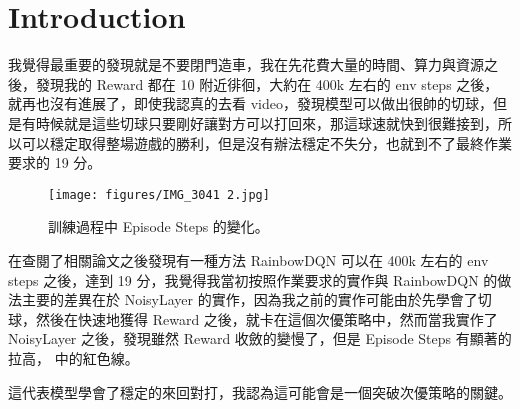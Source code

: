 \section{Introduction}
我覺得最重要的發現就是不要閉門造車，我在先花費大量的時間、算力與資源之後，發現我的 Reward 都在 10 附近徘徊，大約在 400k 左右的 env steps 之後，就再也沒有進展了，即使我認真的去看 video，發現模型可以做出很帥的切球，但是有時候就是這些切球只要剛好讓對方可以打回來，那這球速就快到很難接到，所以可以穩定取得整場遊戲的勝利，但是沒有辦法穩定不失分，也就到不了最終作業要求的 19 分。

\begin{figure}[htbp]
    \centering
    \texttt{[image: figures/IMG\_3041 2.jpg]}
    \caption{訓練過程中 Episode Steps 的變化。}
    \label{fig:episode_steps}
\end{figure}


在查閱了相關論文之後發現有一種方法 RainbowDQN 可以在 400k 左右的 env steps 之後，達到 19 分，我覺得我當初按照作業要求的實作與 RainbowDQN 的做法主要的差異在於 NoisyLayer 的實作，因為我之前的實作可能由於先學會了切球，然後在快速地獲得 Reward 之後，就卡在這個次優策略中，然而當我實作了 NoisyLayer 之後，發現雖然 Reward 收斂的變慢了，但是 Episode Steps 有顯著的拉高，\label{fig:episode_steps} 中的紅色線。


這代表模型學會了穩定的來回對打，我認為這可能會是一個突破次優策略的關鍵。